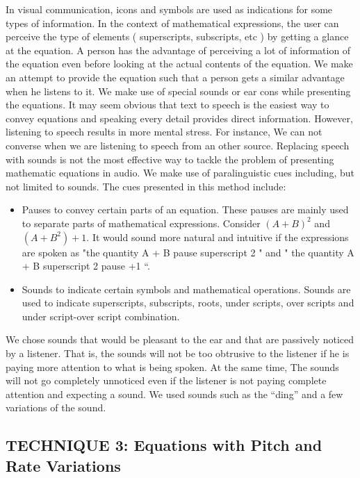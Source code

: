 \documentclass{article}
\begin{document}
In visual communication, icons and symbols are used as indications for some types of information. In the context of mathematical expressions, the user can perceive the type of elements ( superscripts, subscripts, etc ) by getting a glance at the equation. A person has the advantage of perceiving a lot of information of the equation even before looking at the actual contents of the equation. We make an attempt to provide the equation such that a person gets a similar advantage when he listens to it. We make use of special sounds or ear cons while presenting the equations. It may seem obvious that text to speech is the easiest way to convey equations and speaking every detail provides direct information. However, listening to speech results in more mental stress. For instance, We can not converse when we are listening to speech from an other source\cite{dingler2008learnability}.
Replacing speech with sounds is not the most effective way to tackle the problem of presenting mathematic equations in audio. We make use of paralinguistic cues including, but not limited to sounds.
The cues presented in this method include:
\begin{itemize}
\item Pauses to convey certain parts of an equation.
These pauses are mainly used to separate parts of mathematical expressions. Consider $(A+B)^2$ and $(A+B^2)+1$.
It would sound more natural and intuitive if the expressions are spoken as "the quantity A + B pause superscript 2 " and " the quantity A + B superscript 2 pause +1 “.
\item Sounds to indicate certain symbols and mathematical operations.  Sounds are used to indicate superscripts, subscripts, roots, under scripts, over scripts and under script-over script combination.
\end{itemize}
We chose sounds that would be pleasant to the ear and that are passively noticed by a listener. That is, the sounds will not be too obtrusive to the listener if he is paying more attention to what is being spoken. At the same time, The sounds will not go completely unnoticed even if the listener is not paying complete attention and expecting a sound. We used sounds such as the “ding” and a few variations of the sound.




\subsection{TECHNIQUE 3: Equations with Pitch and Rate Variations}
\label{ssec:t3}
\end{document}
